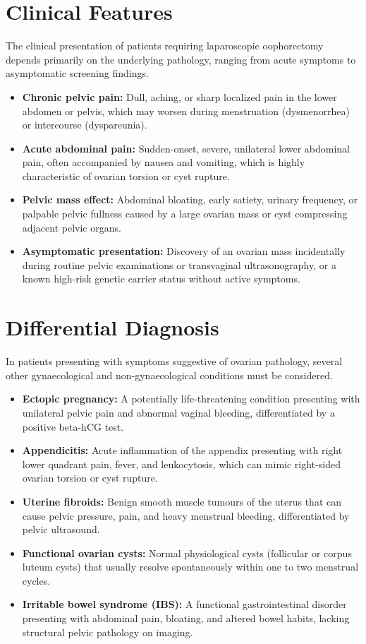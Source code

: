 \section*{Clinical Features}
The clinical presentation of patients requiring laparoscopic oophorectomy depends primarily on the underlying pathology, ranging from acute symptoms to asymptomatic screening findings.
\begin{itemize}
    \item \textbf{Chronic pelvic pain:} Dull, aching, or sharp localized pain in the lower abdomen or pelvis, which may worsen during menstruation (dysmenorrhea) or intercourse (dyspareunia).
    \item \textbf{Acute abdominal pain:} Sudden-onset, severe, unilateral lower abdominal pain, often accompanied by nausea and vomiting, which is highly characteristic of ovarian torsion or cyst rupture.
    \item \textbf{Pelvic mass effect:} Abdominal bloating, early satiety, urinary frequency, or palpable pelvic fullness caused by a large ovarian mass or cyst compressing adjacent pelvic organs.
    \item \textbf{Asymptomatic presentation:} Discovery of an ovarian mass incidentally during routine pelvic examinations or transvaginal ultrasonography, or a known high-risk genetic carrier status without active symptoms.
\end{itemize}

\section*{Differential Diagnosis}
In patients presenting with symptoms suggestive of ovarian pathology, several other gynaecological and non-gynaecological conditions must be considered.
\begin{itemize}
    \item \textbf{Ectopic pregnancy:} A potentially life-threatening condition presenting with unilateral pelvic pain and abnormal vaginal bleeding, differentiated by a positive beta-hCG test.
    \item \textbf{Appendicitis:} Acute inflammation of the appendix presenting with right lower quadrant pain, fever, and leukocytosis, which can mimic right-sided ovarian torsion or cyst rupture.
    \item \textbf{Uterine fibroids:} Benign smooth muscle tumours of the uterus that can cause pelvic pressure, pain, and heavy menstrual bleeding, differentiated by pelvic ultrasound.
    \item \textbf{Functional ovarian cysts:} Normal physiological cysts (follicular or corpus luteum cysts) that usually resolve spontaneously within one to two menstrual cycles.
    \item \textbf{Irritable bowel syndrome (IBS):} A functional gastrointestinal disorder presenting with abdominal pain, bloating, and altered bowel habits, lacking structural pelvic pathology on imaging.
\end{itemize}

